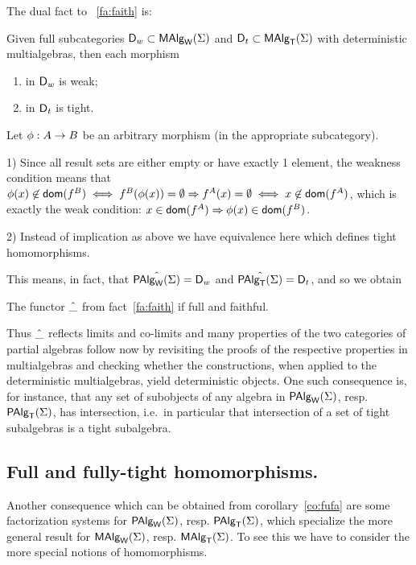 \documentclass[10pt]{article}
\begin{document}
The dual fact to ~\ref{fa:faith} is:

\begin{Fact}
\label{fa:full} 
Given full subcategories $\mbox{\rm\sf D}_w\subset\mbox{\rm\sf MAlg}_{\sf W}(\Sigma)$ and
$\mbox{\rm\sf D}_t\subset\mbox{\rm\sf MAlg}_{\sf T}(\Sigma)$ with deterministic multialgebras, then each
morphism
\begin{enumerate}\MyLPar
\item in $\mbox{\rm\sf D}_w$ is weak;
\item in $\mbox{\rm\sf D}_t$ is tight.
\end{enumerate}
\end{Fact}
\begin{Proof}
Let $\phi:A\rightarrow B$ be an arbitrary morphism (in the appropriate
subcategory).

1) Since all result sets are either empty or have exactly 1 element,
the weakness condition means that $\phi(x)\not\in\mbox{\sf dom}(f^B)\iff
f^B(\phi(x))=\emptyset \Rightarrow f^A(x)=\emptyset \iff x\not\in\mbox{\sf dom}(f^A)$, which is
exactly the weak condition: $x\in\mbox{\sf dom}(f^A)\Rightarrow \phi(x)\in\mbox{\sf dom}(f^B)$.

2) Instead of implication as above we have equivalence here which
defines tight homomorphisms.
\end{Proof}

This means, in fact, that $\hat{\mbox{\rm\sf PAlg}_{\sf W}(\Sigma)}=\mbox{\rm\sf D}_w$ and
$\hat{\mbox{\rm\sf PAlg}_{\sf T}(\Sigma)}=\mbox{\rm\sf D}_t$, and so we obtain

\begin{Corollary}\label{co:fufa}
The functor $\hat{\_}$ from fact~\ref{fa:faith} if full and faithful.
\end{Corollary}

Thus $\hat{\_}$ reflects limits and co-limits and many properties of the
two categories of partial algebras follow now by revisiting the proofs
of the respective properties in multialgebras and checking whether the
constructions, when applied to the deterministic multialgebras, yield
deterministic objects.  One such consequence is, for instance, that
any set of subobjects of any algebra in $\mbox{\rm\sf PAlg}_{\sf W}(\Sigma)$, resp. $\mbox{\rm\sf PAlg}_{\sf T}(\Sigma)$, has
intersection, i.e.\ in particular that intersection of a set of tight
subalgebras is a tight subalgebra.


\subsection{Full and fully-tight homomorphisms.}\label{sub:fjt}

Another consequence which can be obtained from corollary~\ref{co:fufa}
are some factorization systems for $\mbox{\rm\sf PAlg}_{\sf W}(\Sigma)$, resp. $\mbox{\rm\sf PAlg}_{\sf T}(\Sigma)$, which
specialize the more general result for $\mbox{\rm\sf MAlg}_{\sf W}(\Sigma)$, resp. $\mbox{\rm\sf MAlg}_{\sf T}(\Sigma)$. To see
this we have to consider the more special notions of homomorphisms.
\end{document}
